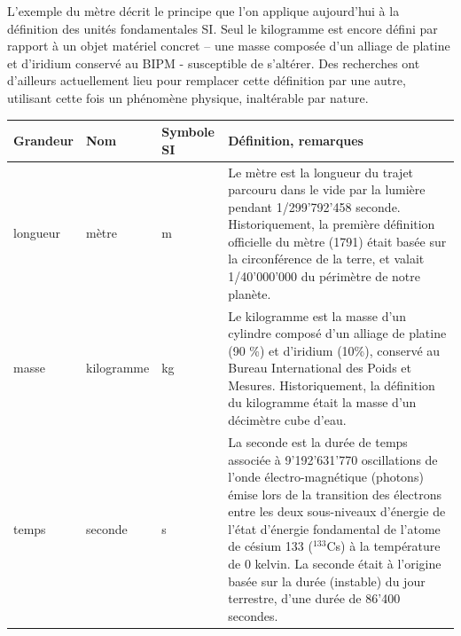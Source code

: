 L'exemple du mètre décrit le principe que l'on applique aujourd'hui à la définition des unités fondamentales SI. Seul le kilogramme est encore défini par rapport à un objet matériel concret – une masse composée d'un alliage de platine et d'iridium conservé au BIPM - susceptible de s'altérer. Des recherches ont d'ailleurs actuellement lieu pour remplacer cette définition par une autre, utilisant cette fois un phénomène physique, inaltérable par nature.

\newpage

\begin{center}
\begin{tabular}[t]{>{\pbs\raggedright}p{2.5cm}
                   >{\pbs\centering}p{2.2cm}
                   >{\pbs\centering}p{2.3cm}
                   >{\pbs\raggedright}p{7cm}}
\hline\hline
\textbf{Grandeur} & \textbf{Nom} & \textbf{Symbole SI} & \textbf{Définition, remarques}\\
\hline
longueur & mètre & m &
Le mètre est la longueur du trajet parcouru dans le vide par la lumière pendant 1/299'792'458 seconde. Historiquement, la première définition officielle du mètre (1791) était basée sur la circonférence de la terre, et valait 1/40'000'000 du périmètre de notre planète.
\\ \hline
masse & kilogramme & kg &
Le kilogramme est la masse d'un cylindre composé d'un alliage de platine (90 \%) et d'iridium (10\%), conservé au Bureau International des Poids et Mesures. Historiquement, la définition du kilogramme était la masse d'un décimètre cube d'eau.
\\ \hline
temps & seconde & s &
La seconde est la durée de temps associée à 9'192'631'770 oscillations de l'onde électro-magnétique (photons) émise lors de la transition des électrons entre les deux sous-niveaux d'énergie de l'état d'énergie fondamental de l'atome de césium 133 ($^{133}$Cs) à la température de 0 kelvin. La seconde était à l'origine basée sur la durée (instable) du jour terrestre, d'une durée de 86'400 secondes.
\\ \hline
\end{tabular}
\end{center}

